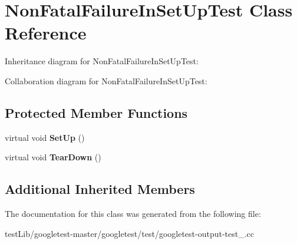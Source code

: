 \hypertarget{classNonFatalFailureInSetUpTest}{}\section{Non\+Fatal\+Failure\+In\+Set\+Up\+Test Class Reference}
\label{classNonFatalFailureInSetUpTest}


Inheritance diagram for Non\+Fatal\+Failure\+In\+Set\+Up\+Test\+:


Collaboration diagram for Non\+Fatal\+Failure\+In\+Set\+Up\+Test\+:
\subsection*{Protected Member Functions}
\begin{DoxyCompactItemize}
\item 
\mbox{\label{classNonFatalFailureInSetUpTest_ae24c724bae1fcd2601f58fa9c26adca3}} 
virtual void {\bfseries Set\+Up} ()
\item 
\mbox{\label{classNonFatalFailureInSetUpTest_a36abc808b11afc6a9bfa20dac5c28c30}} 
virtual void {\bfseries Tear\+Down} ()
\end{DoxyCompactItemize}
\subsection*{Additional Inherited Members}


The documentation for this class was generated from the following file\+:\begin{DoxyCompactItemize}
\item 
test\+Lib/googletest-\/master/googletest/test/googletest-\/output-\/test\+\_\+.\+cc\end{DoxyCompactItemize}
